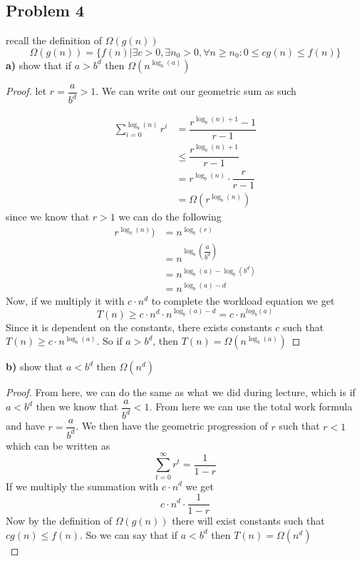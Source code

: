 \documentclass[12pt]{article}
\begin{document}
\subsection*{Problem 4}
recall the definition of $\Omega(g(n))$
\[ \Omega(g(n)) = \{ f(n) | \exists c > 0, \exists n_0 > 0, \forall n \geq n_0 : 0 \leq cg(n) \leq f(n) \} \]
\textbf{a)} show that if $a > b^d$ then $\Omega(n^{\log_{b}(a)})$
\begin{proof}
let $r = \dfrac{a}{b^d} > 1$. We can write out our geometric sum as such

\begin{align*}
\sum^{\log_b(n)}_{i=0} r^i &= \dfrac{r^{\log_b(n) + 1} - 1}{r -1}\\
& \leq \dfrac{r^{\log_b(n) + 1}}{r-1}\\
&= r^{\log_b(n)} \cdot \dfrac{r}{r-1}\\
&= \Omega(r^{\log_b(n)})
\end{align*}
since we know that $r > 1$ we can do the following
\begin{align*}
r^{\log_b(n)}) &= n^{\log_b(r)}\\
&= n^{\log_b(\dfrac{a}{b^d})}\\
&= n^{\log_b(a) - \log_b(b^d)}\\
&= n^{\log_b(a) - d}
\end{align*}
Now, if we multiply it with $c \cdot n^d$ to complete the workload equation we get
\[ T(n) \geq c \cdot n^d \cdot n^{\log_b(a) - d} = c \cdot n^{log_b(a)} \]
Since it is dependent on the constants, there exists constants $c$ such that $T(n) \geq c \cdot n^{\log_b(a)}$. So if $a > b^d$, then $T(n) = \Omega(n^{\log_b(a)})$
\end{proof}
\textbf{b)} show that $a < b^d$ then $\Omega(n^d)$
\begin{proof}
From here, we can do the same as what we did during lecture, which is if $a < b^d$ then we know that $\dfrac{a}{b^d} < 1$. From here we can use the total work formula and have $r = \dfrac{a}{b^d}$. We then have the geometric progression of $r$ such that $r < 1$ which can be written as 
\[ \sum^{\infty}_{t = 0} r^t = \dfrac{1}{1-r}\]
If we multiply the summation with $c \cdot n^d$ we get
\[ c \cdot n^d \cdot \dfrac{1}{1-r} \]
Now by the definition of $\Omega(g(n))$ there will exist constants such that $cg(n) \leq f(n)$. So we can say that if $a < b^d$ then $T(n) = \Omega(n^d)$\\
\end{proof}


\newpage
\end{document}
